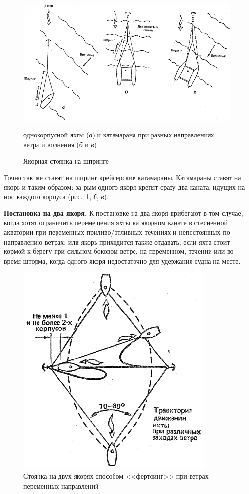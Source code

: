 \documentclass[a4paper, 12pt, twoside, final, book, russian, fittopage, cyremdash]{ncc}
\newcommand{\ris}[1]{\ref{fig:#1}}
\begin{document}
\begin{figure}[htb]
  \centering{}
  \includegraphics[scale=1.3]{0133P}
  \caption{Якорная стоянка на шпринге}
  \label{fig:133}
  \small
  \centering{}
  однокорпусной яхты (\textit{а}) и катамарана при разных направлениях ветра и волнения (\textit{б} и \textit{в})
\end{figure}

Точно так же ставят на шпринг крейсерские катамараны. Катамараны ставят на якорь и таким образом: за рым одного якоря крепят сразу два каната, идущих на нос каждого корпуса (рис.~\ris{133}, \textit{б}, \textit{в}). 

\textbf{Постановка на два якоря.} К постановке на два якоря прибегают в том случае, когда хотят ограничить перемещения яхты на якорном канате в стесненной акватории при переменных приливо\-/отливных течениях и непостоянных по направлению ветрах; или якорь приходится также отдавать, если яхта стоит кормой к берегу при сильном боковом ветре, на переменном, течении или во время шторма, когда одного якоря недостаточно для удержания судна на месте.

\begin{figure}[htb]
  \centering{}
  \includegraphics[scale=1.3]{0134P}
  \caption{Стоянка на двух якорях способом <<фертоинг>> при ветрах переменных направлений}
  \label{fig:134}
\end{figure}
\end{document}
